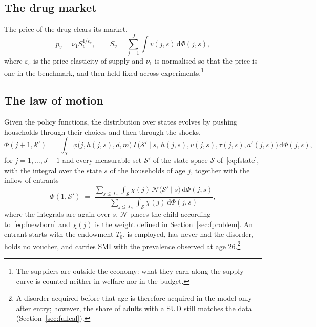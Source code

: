 \documentclass[10pt]{article}
\begin{document}
\subsection{The drug market}

The price of the drug clears its market,
\begin{equation}\label{eq:fdrug}
p_v=\nu_1 S_v^{1/\varepsilon_s},
\qquad S_v=\sum_{j=1}^{J}\int v(j,s)\,\mathrm{d}\Phi(j,s),
\end{equation}
where $\varepsilon_s$ is the price elasticity of supply and $\nu_1$ is normalised so
that the price is one in the benchmark, and then held fixed across experiments.\footnote{The suppliers are outside the economy: what they earn along the supply curve is counted neither in welfare nor in the budget.}

\subsection{The law of motion}\label{sec:fnewbornsec}

Given the policy functions, the distribution over states evolves by pushing
households through their choices and then through the shocks,
\begin{equation}\label{eq:flom}
\Phi(j{+}1,\mathcal S')\;=\;\int_{\mathcal S}\!\phi\big(j,h(j,s),d,m\big)\,
\Gamma\big(\mathcal S'\mid s,\,h(j,s),v(j,s),\tau(j,s),a'(j,s)\big)\,
\mathrm{d}\Phi(j,s),
\end{equation}
for $j=1,\dots,J-1$ and every measurable set $\mathcal S'$ of the state space $\mathcal S$ of~\eqref{eq:fstate}, with the integral over the state $s$ of the households of age $j$, together with the inflow of entrants
\begin{equation}\label{eq:flomnew}
\Phi(1,\mathcal S')\;=\;\frac{\sum_{j\le J_K}\int_{\mathcal S}\!\chi(j)\,
\mathcal N\big(\mathcal S'\mid s\big)\,\mathrm{d}\Phi(j,s)}
{\sum_{j\le J_K}\int_{\mathcal S}\!\chi(j)\,\mathrm{d}\Phi(j,s)},
\end{equation}
where the integrals are again over $s$, $\mathcal N$ places the child according
to~\eqref{eq:fnewborn} and $\chi(j)$ is the weight defined in Section~\ref{sec:fproblem}. An entrant starts with the endowment $T_0$, is employed, has never had the disorder, holds no voucher, and carries SMI with the prevalence observed at age 26.\footnote{A disorder acquired before that age is therefore acquired in the model only after entry; however, the share of adults with a SUD still matches the data (Section~\ref{sec:fullcal}).}
\end{document}
